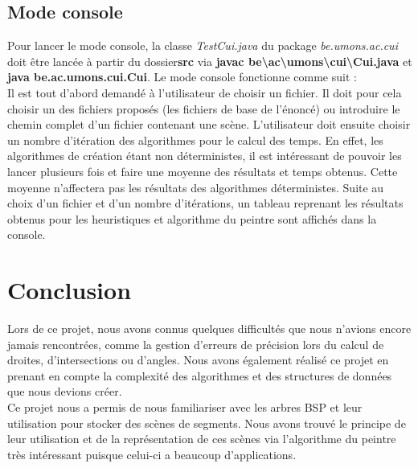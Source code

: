 \documentclass[11pt,a4paper]{article}
\theoremstyle{definition}
\theoremstyle{remark}
\begin{document}
\subsection{Mode console}

Pour lancer le mode console, la classe \textit{TestCui.java} du package \textit{be.umons.ac.cui} doit être lancée à partir du dossier\textbf{src} via \textbf{javac be\textbackslash ac\textbackslash umons\textbackslash cui\textbackslash Cui.java} et \textbf{java be.ac.umons.cui.Cui}. Le mode console fonctionne comme suit :\\

Il est tout d'abord demandé à l'utilisateur de choisir un fichier. Il doit pour cela choisir un des fichiers proposés (les fichiers de base de l'énoncé) ou introduire le chemin complet d'un fichier contenant une scène. L'utilisateur doit ensuite choisir un nombre d'itération des algorithmes pour le calcul des temps. En effet, les algorithmes de création étant non déterministes, il est intéressant de pouvoir les lancer plusieurs fois et faire une moyenne des résultats et temps obtenus. Cette moyenne n'affectera pas les résultats des algorithmes déterministes. Suite au choix d'un fichier et d'un nombre d'itérations, un tableau reprenant les résultats obtenus pour les heuristiques et algorithme du peintre sont affichés dans la console.

\section*{Conclusion}
Lors de ce projet, nous avons connus quelques difficultés que nous n'avions encore jamais rencontrées, comme la gestion d'erreurs de précision lors du calcul de droites, d'intersections ou d'angles. Nous avons également réalisé ce projet en prenant en compte la complexité des algorithmes et des structures de données que nous devions créer.\\

Ce projet nous a permis de nous familiariser avec les arbres BSP et leur utilisation pour stocker des scènes de segments. Nous avons trouvé le principe de leur utilisation et de la représentation de ces scènes via l'algorithme du peintre très intéressant puisque celui-ci a beaucoup d'applications. 
\end{document}
